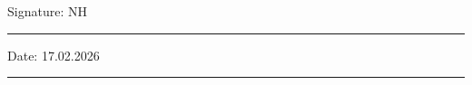 \documentclass[11pt,oneside]{book}
\begin{document}
\noindent Signature: NH\\[1mm]
\rule[1em]{25em}{0.5pt}

\noindent Date: 17.02.2026\\[1mm]
\rule[1em]{25em}{0.5pt}






\tableofcontents
\listoffigures
\listoftables


\mainmatter








 
 


\begin{appendices}

\end{appendices}

\end{document}
